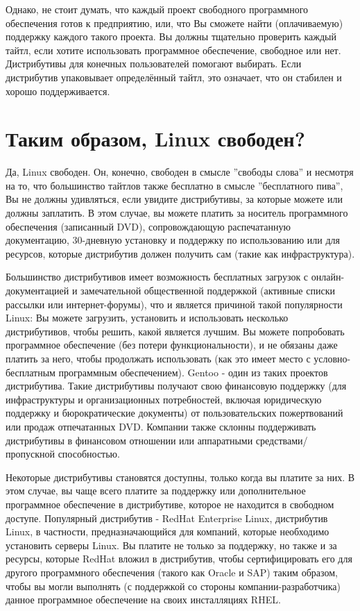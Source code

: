\documentclass[12pt]{book}
\begin{document}
Однако, не стоит думать, что каждый проект свободного программного обеспечения готов к предприятию, или, что Вы сможете найти (оплачиваемую) поддержку каждого такого проекта. Вы должны тщательно проверить каждый тайтл, если хотите использовать программное обеспечение, свободное или нет. Дистрибутивы для конечных пользователей помогают выбирать. Если дистрибутив упаковывает определённый тайтл, это означает, что он стабилен и хорошо поддерживается.

\section{Таким образом, Linux свободен?}

Да, Linux свободен. Он, конечно, свободен в смысле ''свободы слова'' и несмотря на то, что большинство тайтлов также бесплатно в смысле ''бесплатного пива'', Вы не должны удивляться, если увидите дистрибутивы, за которые можете или должны заплатить. В этом случае, вы можете платить за носитель программного обеспечения (записанный DVD), сопровождающую распечатанную документацию, 30-дневную установку и поддержку по  использованию или для ресурсов, которые дистрибутив должен получить сам (такие как инфраструктура).

Большинство дистрибутивов имеет возможность бесплатных загрузок с онлайн-документацией и замечательной общественной поддержкой (активные списки рассылки или интернет-форумы), что и является причиной такой популярности Linux: Вы можете загрузить, установить и использовать несколько дистрибутивов, чтобы решить, какой является лучшим. Вы можете попробовать программное обеспечение (без потери функциональности), и не обязаны даже платить за него, чтобы продолжать использовать (как это имеет место с условно-бесплатным программным обеспечением). Gentoo - один из таких проектов дистрибутива. Такие дистрибутивы получают свою финансовую поддержку (для инфраструктуры и организационных потребностей, включая юридическую поддержку и бюрократические документы) от пользовательских пожертвований или продаж отпечатанных DVD. Компании также склонны поддерживать дистрибутивы в финансовом отношении или аппаратными средствами/пропускной способностью.

Некоторые дистрибутивы становятся доступны, только когда вы платите за них. В этом случае, вы чаще всего платите за поддержку или дополнительное программное обеспечение в дистрибутиве, которое не находится в свободном доступе. Популярный дистрибутив - RedHat Enterprise Linux, дистрибутив Linux, в частности, предназначающийся для компаний, которые необходимо установить серверы Linux. Вы платите не только за поддержку, но также и за ресурсы, которые RedHat вложил в дистрибутив, чтобы сертифицировать его для другого программного обеспечения (такого как Oracle и SAP) таким образом, чтобы вы могли выполнять (с поддержкой со стороны компании-разработчика)  данное программное обеспечение на своих инсталляциях RHEL.
\end{document}
